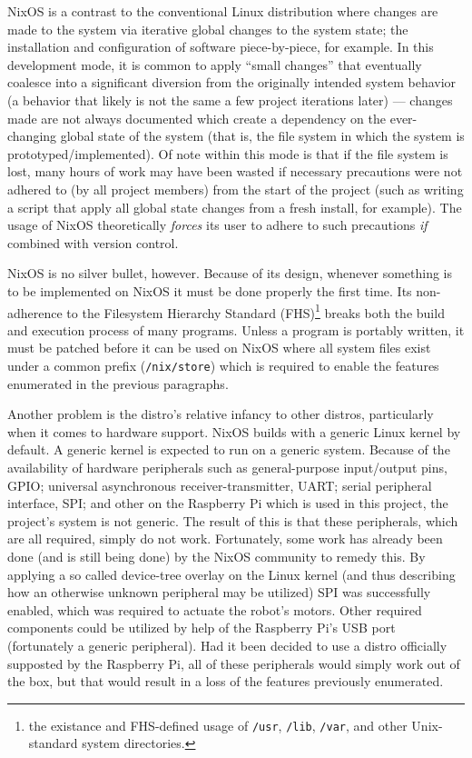 NixOS is a contrast to the conventional Linux distribution where changes are made to the system via iterative global changes to the system state;
the installation and configuration of software piece-by-piece, for example.
In this development mode, it is common to apply ``small changes'' that eventually coalesce into a significant diversion from the originally intended system behavior (a behavior that likely is not the same a few project iterations later) ---
changes made are not always documented which create a dependency on the ever-changing global state of the system (that is, the file system in which the system is prototyped/implemented).
Of note within this mode is that if the file system is lost,
many hours of work may have been wasted if necessary precautions were not adhered to (by all project members) from the start of the project (such as writing a script that apply all global state changes from a fresh install, for example).
The usage of NixOS theoretically \textit{forces} its user to adhere to such precautions \textit{if} combined with version control.

NixOS is no silver bullet, however.
Because of its design, whenever something is to be implemented on NixOS it must be done properly the first time.
Its non-adherence to the Filesystem Hierarchy Standard (FHS)\footnote{the existance and FHS-defined usage of \texttt{/usr}, \texttt{/lib}, \texttt{/var}, and other Unix-standard system directories.} breaks both the build and execution process of many programs.
Unless a program is portably written, it must be patched before it can be used on NixOS where all system files exist under a common prefix (\texttt{/nix/store}) which is required to enable the features enumerated in the previous paragraphs.

Another problem is the distro's relative infancy to other distros, particularly when it comes to hardware support.
NixOS builds with a generic Linux kernel by default.
A generic kernel is expected to run on a generic system.
Because of the availability of hardware peripherals such as general-purpose input/output pins, GPIO;
universal asynchronous receiver-transmitter, UART;
serial peripheral interface, SPI; and other on the Raspberry Pi which is used in this project, the project's system is not generic.
The result of this is that these peripherals, which are all required, simply do not work.
Fortunately, some work has already been done (and is still being done) by the NixOS community to remedy this.
By applying a so called device-tree overlay on the Linux kernel (and thus describing how an otherwise unknown peripheral may be utilized) SPI was successfully enabled,
which was required to actuate the robot's motors.
Other required components could be utilized by help of the Raspberry Pi's USB port (fortunately a generic peripheral).
Had it been decided to use a distro officially supposted by the Raspberry Pi,
all of these peripherals would simply work out of the box,
but that would result in a loss of the features previously enumerated.

